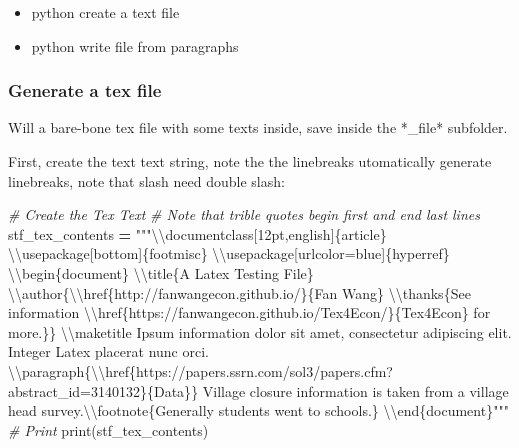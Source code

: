 \documentclass[
]{book}
\newenvironment{Shaded}{\begin{snugshade}}{\end{snugshade}}
\newcommand{\BuiltInTok}[1]{#1}
\newcommand{\CharTok}[1]{\textcolor[rgb]{0.31,0.60,0.02}{#1}}
\newcommand{\CommentTok}[1]{\textcolor[rgb]{0.56,0.35,0.01}{\textit{#1}}}
\newcommand{\NormalTok}[1]{#1}
\newcommand{\OperatorTok}[1]{\textcolor[rgb]{0.81,0.36,0.00}{\textbf{#1}}}
\newcommand{\SpecialCharTok}[1]{\textcolor[rgb]{0.00,0.00,0.00}{#1}}
\newcommand{\StringTok}[1]{\textcolor[rgb]{0.31,0.60,0.02}{#1}}
\providecommand{\tightlist}{%
  \setlength{\itemsep}{0pt}\setlength{\parskip}{0pt}}
\begin{document}
\begin{itemize}
\tightlist
\item
  python create a text file
\item
  python write file from paragraphs
\end{itemize}

\hypertarget{generate-a-tex-file}{%
\subsubsection{Generate a tex file}\label{generate-a-tex-file}}

Will a bare-bone tex file with some texts inside, save inside the *\_file* subfolder.

First, create the text text string, note the the linebreaks utomatically generate linebreaks, note that slash need double slash:

\begin{Shaded}
\begin{Highlighting}[]
\CommentTok{\# Create the Tex Text}
\CommentTok{\# Note that trible quotes begin first and end last lines}
\NormalTok{stf\_tex\_contents }\OperatorTok{=} \StringTok{"""}\CharTok{\textbackslash{}\textbackslash{}}\StringTok{documentclass[12pt,english]}\SpecialCharTok{\{article\}}
\CharTok{\textbackslash{}\textbackslash{}}\StringTok{usepackage[bottom]}\SpecialCharTok{\{footmisc\}}
\CharTok{\textbackslash{}\textbackslash{}}\StringTok{usepackage[urlcolor=blue]}\SpecialCharTok{\{hyperref\}}
\CharTok{\textbackslash{}\textbackslash{}}\StringTok{begin}\SpecialCharTok{\{document\}}
\CharTok{\textbackslash{}\textbackslash{}}\StringTok{title\{A Latex Testing File\}}
\CharTok{\textbackslash{}\textbackslash{}}\StringTok{author\{}\CharTok{\textbackslash{}\textbackslash{}}\StringTok{href\{http://fanwangecon.github.io/\}\{Fan Wang\} }\CharTok{\textbackslash{}\textbackslash{}}\StringTok{thanks\{See information }\CharTok{\textbackslash{}\textbackslash{}}\StringTok{href\{https://fanwangecon.github.io/Tex4Econ/\}}\SpecialCharTok{\{Tex4Econ\}}\StringTok{ for more.}\SpecialCharTok{\}\}}
\CharTok{\textbackslash{}\textbackslash{}}\StringTok{maketitle}
\StringTok{Ipsum information dolor sit amet, consectetur adipiscing elit. Integer Latex placerat nunc orci.}
\CharTok{\textbackslash{}\textbackslash{}}\StringTok{paragraph\{}\CharTok{\textbackslash{}\textbackslash{}}\StringTok{href\{https://papers.ssrn.com/sol3/papers.cfm?abstract\_id=3140132\}}\SpecialCharTok{\{Data\}}\StringTok{\}}
\StringTok{Village closure information is taken from a village head survey.}\CharTok{\textbackslash{}\textbackslash{}}\StringTok{footnote\{Generally students went to schools.\}}
\CharTok{\textbackslash{}\textbackslash{}}\StringTok{end}\SpecialCharTok{\{document\}}\StringTok{"""}
\CommentTok{\# Print}
\BuiltInTok{print}\NormalTok{(stf\_tex\_contents)}
\end{Highlighting}
\end{Shaded}
\end{document}
